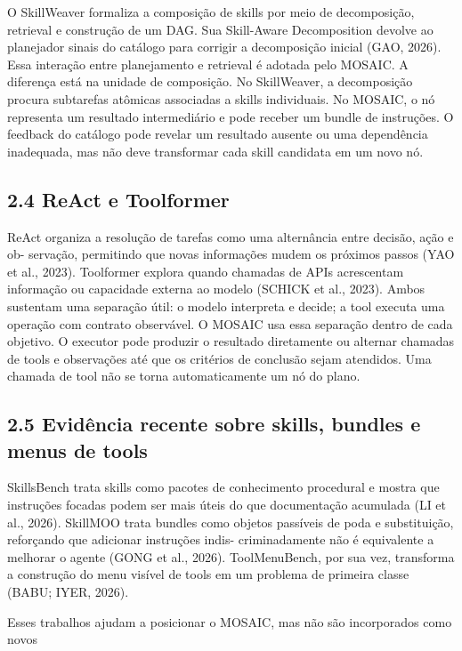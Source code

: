 \documentclass[12pt,a4paper]{article}
\begin{document}
O SkillWeaver formaliza a composição de skills por meio de decomposição, retrieval e construção de um DAG. Sua Skill-Aware Decomposition devolve ao planejador sinais do catálogo para corrigir a decomposição inicial (GAO, 2026). Essa interação entre planejamento e retrieval é adotada pelo MOSAIC. A diferença está na unidade de composição. No SkillWeaver, a decomposição procura subtarefas atômicas associadas a skills individuais. No MOSAIC, o nó representa um resultado intermediário e pode receber um bundle de instruções. O feedback do catálogo pode revelar um resultado ausente ou uma dependência inadequada, mas não deve transformar cada skill candidata em um novo nó.



\subsection*{2.4 ReAct e Toolformer}

ReAct organiza a resolução de tarefas como uma alternância entre decisão, ação e ob- servação, permitindo que novas informações mudem os próximos passos (YAO et al., 2023). Toolformer explora quando chamadas de APIs acrescentam informação ou capacidade externa ao modelo (SCHICK et al., 2023). Ambos sustentam uma separação útil: o modelo interpreta e decide; a tool executa uma operação com contrato observável. O MOSAIC usa essa separação dentro de cada objetivo. O executor pode produzir o resultado diretamente ou alternar chamadas de tools e observações até que os critérios de conclusão sejam atendidos. Uma chamada de tool não se torna automaticamente um nó do plano.


\subsection*{2.5 Evidência recente sobre skills, bundles e menus de tools}

SkillsBench trata skills como pacotes de conhecimento procedural e mostra que instruções focadas podem ser mais úteis do que documentação acumulada (LI et al., 2026). SkillMOO trata bundles como objetos passíveis de poda e substituição, reforçando que adicionar instruções indis- criminadamente não é equivalente a melhorar o agente (GONG et al., 2026). ToolMenuBench, por sua vez, transforma a construção do menu visível de tools em um problema de primeira classe (BABU; IYER, 2026).


Esses trabalhos ajudam a posicionar o MOSAIC, mas não são incorporados como novos
\end{document}
